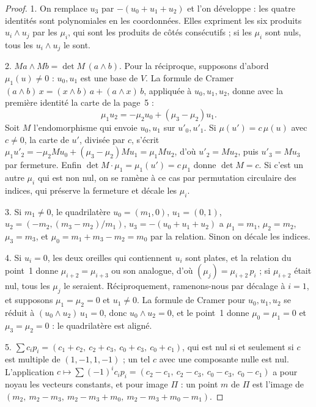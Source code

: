 \begin{proof}
1. On remplace $u_3$ par $-(u_0 + u_1 + u_2)$ et l'on développe : les quatre identités sont polynomiales en les coordonnées. Elles expriment les six produits $u_i \wedge u_j$ par les $\mu_i$, qui sont les produits de côtés consécutifs ; si les $\mu_i$ sont nuls, tous les $u_i \wedge u_j$ le sont.

2. $Ma \wedge Mb = \det M\,(a \wedge b)$. Pour la réciproque, supposons d'abord $\mu_1(u) \neq 0$ : $u_0, u_1$ est une base de $V$. La formule de Cramer $(a \wedge b)\,x = (x \wedge b)\,a + (a \wedge x)\,b$, appliquée à $u_0, u_1, u_2$, donne avec la première identité la carte de la page~5 :
\[ \mu_1 u_2 = -\mu_2 u_0 + (\mu_3 - \mu_2) u_1 . \]
Soit $M$ l'endomorphisme qui envoie $u_0, u_1$ sur $u'_0, u'_1$. Si $\mu(u') = c\,\mu(u)$ avec $c \neq 0$, la carte de $u'$, divisée par $c$, s'écrit $\mu_1 u'_2 = -\mu_2 Mu_0 + (\mu_3 - \mu_2)Mu_1 = \mu_1 Mu_2$, d'où $u'_2 = Mu_2$, puis $u'_3 = Mu_3$ par fermeture. Enfin $\det M \cdot \mu_1 = \mu_1(u') = c\,\mu_1$ donne $\det M = c$. Si c'est un autre $\mu_i$ qui est non nul, on se ramène à ce cas par permutation circulaire des indices, qui préserve la fermeture et décale les $\mu_i$.

3. Si $m_1 \neq 0$, le quadrilatère $u_0 = (m_1, 0)$, $u_1 = (0, 1)$, $u_2 = (-m_2, (m_3 - m_2)/m_1)$, $u_3 = -(u_0 + u_1 + u_2)$ a $\mu_1 = m_1$, $\mu_2 = m_2$, $\mu_3 = m_3$, et $\mu_0 = m_1 + m_3 - m_2 = m_0$ par la relation. Sinon on décale les indices.

4. Si $u_i = 0$, les deux oreilles qui contiennent $u_i$ sont plates, et la relation du point~1 donne $\mu_{i+2} = \mu_{i+3}$ ou son analogue, d'où $(\mu_j) = \mu_{i+2}\,p_i$ ; si $\mu_{i+2}$ était nul, tous les $\mu_j$ le seraient. Réciproquement, ramenons-nous par décalage à $i = 1$, et supposons $\mu_1 = \mu_2 = 0$ et $u_1 \neq 0$. La formule de Cramer pour $u_0, u_1, u_2$ se réduit à $(u_0 \wedge u_2)\,u_1 = 0$, donc $u_0 \wedge u_2 = 0$, et le point~1 donne $\mu_0 = \mu_1 = 0$ et $\mu_3 = \mu_2 = 0$ : le quadrilatère est aligné.

5. $\sum c_ip_i = (c_1 + c_2,\ c_2 + c_3,\ c_0 + c_3,\ c_0 + c_1)$, qui est nul si et seulement si $c$ est multiple de $(1, -1, 1, -1)$ ; un tel $c$ avec une composante nulle est nul. L'application $c \mapsto \sum (-1)^ic_ip_i = (c_2 - c_1,\ c_2 - c_3,\ c_0 - c_3,\ c_0 - c_1)$ a pour noyau les vecteurs constants, et pour image $\Pi$ : un point $m$ de $\Pi$ est l'image de $(m_2,\ m_2 - m_3,\ m_2 - m_3 + m_0,\ m_2 - m_3 + m_0 - m_1)$.
\end{proof}

